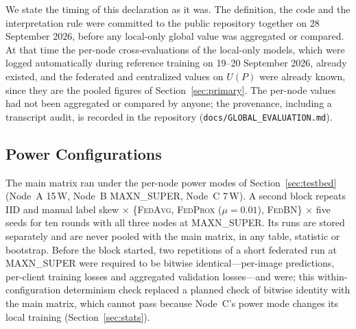 \documentclass[journal]{IEEEtran}
\newcommand{\fedavg}{\textsc{FedAvg}}
\newcommand{\fedprox}{\textsc{FedProx}}
\newcommand{\fedbn}{\textsc{FedBN}}
\begin{document}
We state the timing of this declaration as it was. The definition, the code and the interpretation rule were committed to the public repository together on 28 September 2026, before any local-only global value was aggregated or compared. At that time the per-node cross-evaluations of the local-only models, which were logged automatically during reference training on 19--20 September 2026, already existed, and the federated and centralized values on $U(P)$ were already known, since they are the pooled figures of Section~\ref{sec:primary}. The per-node values had not been aggregated or compared by anyone; the provenance, including a transcript audit, is recorded in the repository (\texttt{docs/GLOBAL\_EVALUATION.md}).

\subsection{Power Configurations}
\label{sec:powercfg}

The main matrix ran under the per-node power modes of Section~\ref{sec:testbed} (Node~A 15\,W, Node~B MAXN\_SUPER, Node~C 7\,W). A second block repeats IID and manual label skew $\times$ \{\fedavg{}, \fedprox{} ($\mu=0.01$), \fedbn{}\} $\times$ five seeds for ten rounds with all three nodes at MAXN\_SUPER. Its runs are stored separately and are never pooled with the main matrix, in any table, statistic or bootstrap. Before the block started, two repetitions of a short federated run at MAXN\_SUPER were required to be bitwise identical---per-image predictions, per-client training losses and aggregated validation losses---and were; this within-configuration determinism check replaced a planned check of bitwise identity with the main matrix, which cannot pass because Node~C's power mode changes its local training (Section~\ref{sec:stats}).
\end{document}
